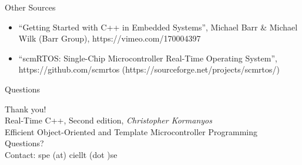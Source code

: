 \documentclass{beamer}
\begin{document}
\begin{frame}{Other Sources}
  \begin{itemize}
  \item ``Getting Started with C++ in Embedded Systems'',
    Michael Barr \& Michael Wilk (Barr Group), https://vimeo.com/170004397
  \item ``scmRTOS: Single-Chip Microcontroller Real-Time Operating System'',
    https://github.com/scmrtos (https://sourceforge.net/projects/scmrtos/)
  \end{itemize}
\end{frame}

\begin{frame}{Questions}
\begin{center}
  \Large Thank you! \normalsize\\
  \vspace{5mm}
  Real-Time C++, Second edition, \emph{Christopher Kormanyos} \\
  \tiny Efficient Object-Oriented and Template Microcontroller Programming \\
  \vspace{5mm}
  \normalsize Questions? \\
  \vspace{3mm}
  Contact: spe (at) ciellt (dot )se

\end{center}
\end{frame}


\end{document}
